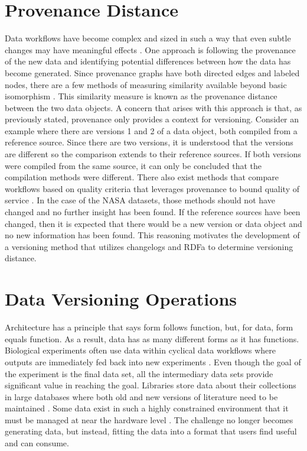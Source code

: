 \section{Provenance Distance}

Data workflows have become complex and sized in such a way that even subtle changes may have meaningful effects \cite{TILMES2011548}.
One approach is following the provenance of the new data and identifying potential differences between how the data has become generated.
Since provenance graphs have both directed edges and labeled nodes, there are a few methods of measuring similarity available beyond basic isomorphism \cite{Cao2013} \cite{Gao2010} \cite{Goddard:1996:DGU:246962.246972} .
This similarity measure is known as the provenance distance between the two data objects.
A concern that arises with this approach is that, as previously stated, provenance only provides a context for versioning.
Consider an example where there are versions 1 and 2 of a data object, both compiled from a reference source.
Since there are two versions, it is understood that the versions are different so the comparison extends to their reference sources.
If both versions were compiled from the same source, it can only be concluded that the compilation methods were different.
There also exist methods that compare workflows based on quality criteria that leverages provenance to bound quality of service \cite{2015:CAA:2778374.2778504}.
In the case of the NASA datasets, those methods should not have changed and no further insight has been found.
If the reference sources have been changed, then it is expected that there would be a new version or data object and no new information has been found.
This reasoning motivates the development of a versioning method that utilizes changelogs and RDFa to determine versioning distance.

\section{Data Versioning Operations}

Architecture has a principle that says form follows function, but, for data, form equals function.
As a result, data has as many different forms as it has functions.
Biological experiments often use data within cyclical data workflows where outputs are immediately fed back into new experiments \cite{Tagger2005}.
Even though the goal of the experiment is the final data set, all the intermediary data sets provide significant value in reaching the goal.
Libraries store data about their collections in large databases where both old and new versions of literature need to be maintained \cite{Wiil:2000:RDH:338407.338517}.
Some data exist in such a highly constrained environment that it must be managed at near the hardware level \cite{Flouris04clotho:transparent}.
The challenge no longer becomes generating data, but instead, fitting the data into a format that users find useful and can consume.

